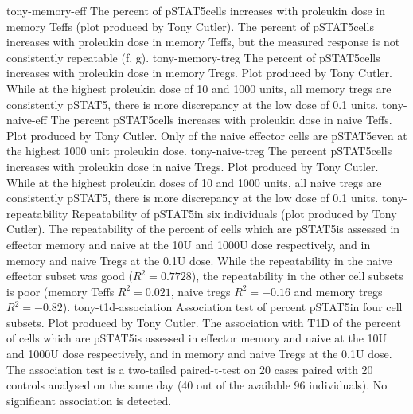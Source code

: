 {tony-memory-eff}
{
  The percent of pSTAT5\positive cells increases with proleukin dose in memory Teffs (plot produced by Tony Cutler).
}
{
The percent of pSTAT5\positive cells increases with proleukin dose in memory Teffs, but the measured response is not consistently repeatable (f, g).
}
{tony-memory-treg}
{ The percent of pSTAT5\positive cells increases with proleukin dose in memory Tregs. }
{
  Plot produced by Tony Cutler.
  While at the highest proleukin dose of 10 and 1000 units, all memory tregs are consistently pSTAT5\positive,
  there is more discrepancy at the low dose of 0.1 units.
}
{tony-naive-eff}
{ The percent pSTAT5\positive cells increases with proleukin dose in naive Teffs. }
{
  Plot produced by Tony Cutler.
  Only  of the naive effector cells are pSTAT5\positive even at the highest 1000 unit proleukin dose.
}
{tony-naive-treg}
{ The percent pSTAT5\positive cells increases with proleukin dose in naive Tregs. }
{
  Plot produced by Tony Cutler.
  While at the highest proleukin doses of 10 and 1000 units, all naive tregs are consistently pSTAT5\positive,
  there is more discrepancy at the low dose of 0.1 units.
}
{tony-repeatability}
{ Repeatability of pSTAT5\positive in six individuals (plot produced by Tony Cutler). }
{
The repeatability of the percent of cells which are pSTAT5\positive is assessed in effector memory and naive at the 10U and 1000U dose respectively, and in memory and naive Tregs at the 0.1U dose.
While the repeatability in the naive effector subset was good ($R^2=0.7728$), the repeatability in the other cell subsets is poor (memory Teffs $R^2=0.021$, naive tregs $R^2=-0.16$ and memory tregs $R^2=-0.82$).
}
{tony-t1d-association}
{ Association test of percent pSTAT5\positive in four cell subsets. }
{
  Plot produced by Tony Cutler.
  The association with T1D of the percent of cells which are pSTAT5\positive is assessed in effector memory and naive at the 10U and 1000U dose
  respectively, and in memory and naive Tregs at the 0.1U dose.
  The association test is a two-tailed paired-t-test on 20 cases paired with 20 controls analysed on the same day (40 out of the available 96 individuals).
  No significant association is detected.
}

